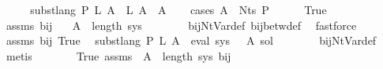 \begin{isabellebody}
%
\isadelimproof
%
\endisadelimproof
%
\isatagproof
{}\isamarkupfalse%
\ {\isacharminus}{\kern0pt}\isanewline
\ \ \isamarkupfalse%
\ {\isachardoublequoteopen}subst{\isacharunderscore}{\kern0pt}lang\ P\ {\isacharquery}{\kern0pt}L{\isacharprime}{\kern0pt}\ A\ {\isasymsubseteq}\ {\isacharquery}{\kern0pt}L{\isacharprime}{\kern0pt}\ A{\isachardoublequoteclose}\ \ A\isanewline
\ \ \isamarkupfalse%
\ {\isacharparenleft}{\kern0pt}cases\ {\isachardoublequoteopen}A\ {\isasymin}\ Nts\ P{\isachardoublequoteclose}{\isacharparenright}{\kern0pt}\isanewline
\ \ \ \ \isamarkupfalse%
\ True\isanewline
\ \ \ \ \isamarkupfalse%
\ assms{\isacharparenleft}{\kern0pt}{}{\isacharparenright}{\kern0pt}\ bij{\isacharunderscore}{\kern0pt}{\isasymgamma}{\isacharunderscore}{\kern0pt}{\isasymgamma}{\isacharprime}{\kern0pt}\ \isamarkupfalse%
\ {\isachardoublequoteopen}{\isasymgamma}{\isacharprime}{\kern0pt}\ A\ {\isacharless}{\kern0pt}\ length\ sys{\isachardoublequoteclose}\isanewline
\ \ \ \ \ \ \isamarkupfalse%
\ bij{\isacharunderscore}{\kern0pt}Nt{\isacharunderscore}{\kern0pt}Var{\isacharunderscore}{\kern0pt}def\ bij{\isacharunderscore}{\kern0pt}betw{\isacharunderscore}{\kern0pt}def\ \isamarkupfalse%
\ fastforce\isanewline
\ \ \ \ \isamarkupfalse%
\ assms{\isacharparenleft}{\kern0pt}{}{\isacharparenright}{\kern0pt}\ bij{\isacharunderscore}{\kern0pt}{\isasymgamma}{\isacharunderscore}{\kern0pt}{\isasymgamma}{\isacharprime}{\kern0pt}\ True\ \isamarkupfalse%
\ {\isachardoublequoteopen}subst{\isacharunderscore}{\kern0pt}lang\ P\ {\isacharquery}{\kern0pt}L{\isacharprime}{\kern0pt}\ A\ {\isacharequal}{\kern0pt}\ eval\ {\isacharparenleft}{\kern0pt}sys\ {\isacharbang}{\kern0pt}\ {\isasymgamma}{\isacharprime}{\kern0pt}\ A{\isacharparenright}{\kern0pt}\ sol{\isacharprime}{\kern0pt}{\isachardoublequoteclose}\isanewline
\ \ \ \ \ \ \isamarkupfalse%
\ bij{\isacharunderscore}{\kern0pt}Nt{\isacharunderscore}{\kern0pt}Var{\isacharunderscore}{\kern0pt}def\ \isamarkupfalse%
\ metis\isanewline
\ \ \ \ \isamarkupfalse%
\ \isamarkupfalse%
\ True\ assms{\isacharparenleft}{\kern0pt}{}{\isacharparenright}{\kern0pt}\ {\isacartoucheopen}{\isasymgamma}{\isacharprime}{\kern0pt}\ A\ {\isacharless}{\kern0pt}\ length\ sys{\isacartoucheclose}\ bij{\isacharunderscore}{\kern0pt}{\isasymgamma}{\isacharunderscore}{\kern0pt}{\isasymgamma}{\isacharprime}{\kern0pt}\ \isamarkupfalse%

\end{isabellebody}
